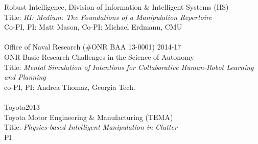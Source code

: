 Robust Intelligence, Division of Information \& Intelligent Systems (IIS)\\
Title: \textit{RI: Medium: The Foundations of a Manipulation Repertoire}\\
Co-PI, PI: Matt Mason, Co-PI: Michael Erdmann, CMU\\
\\
Office of Naval Research (\#ONR BAA 13-0001) \hfill 2014-17\\
ONR Basic Research Challenges in the Science of Autonomy\\
Title: \textit{Mental Simulation of Intentions for Collaborative Human-Robot Learning and Planning}\\
co-PI, PI: Andrea Thomaz, Georgia Tech.	\\
\\
Toyota\hfill 2013-\\
Toyota Motor Engineering \& Manufacturing (TEMA)\\
Title: \textit{Physics-based Intelligent Manipulation in Clutter}\\
PI\\
\\


